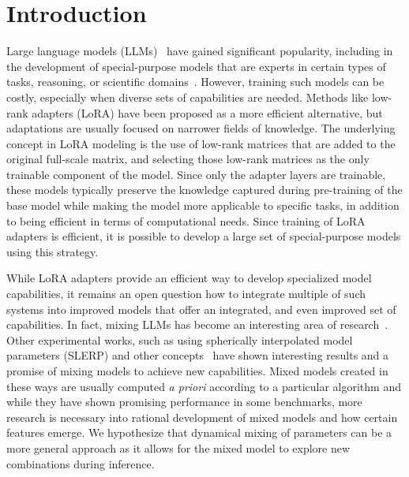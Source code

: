 \documentclass{article}
\begin{document}
\section{Introduction}
Large language models (LLMs)~\cite{Vaswani2017AttentionNeedc,Touvron2023LlamaModels,OpenAI2023GPT-4Report,Chowdhery2022PaLM:Pathways,Jiang2023Mistral7B,Gunasekar2023TextbooksNeed} have gained significant popularity, including in the development of special-purpose models that are experts in certain types of tasks, reasoning, or scientific domains~\cite{Bubeck2023SparksGPT-4,Buehler2023MechGPTModalities,Nejjar2023LLMsAnalysis,Buehler2023GenerativeDesign,Luu2023BioinspiredLLM:Materials,Luu2023GenerativeSolvents,Buehler2023MeLMProblemsb,Ge2023OpenAGI:Experts}.%
However, training such models can be costly, especially when diverse sets of capabilities are needed. Methods like low-rank adapters (LoRA)\cite{hu2021lora} have been proposed as a more efficient alternative, but adaptations are usually focused on narrower fields of knowledge.  The underlying concept in LoRA modeling is the use of low-rank matrices that are added to the original full-scale matrix, and selecting those low-rank matrices as the only trainable component of the model. Since only the adapter layers are trainable, these models typically preserve the knowledge captured during pre-training of the base model while making the model more applicable to specific tasks, in addition to being efficient in terms of computational needs. Since training of LoRA adapters is efficient, it is possible to develop a large set of special-purpose models using this strategy.

While LoRA adapters provide an efficient way to develop specialized model capabilities, it remains an open question how to integrate multiple of such systems into improved models that offer an integrated, and even improved set of capabilities. In fact, mixing LLMs has become an interesting area of research~\cite{Kim2023SOLARUp-Scaling}. Other experimental works, such as using spherically interpolated model parameters (SLERP) and other concepts~\cite{Arcee-ai/mergekit:Models.} have shown interesting results and a promise of mixing models to achieve new capabilities. Mixed models created in these ways are usually computed {\it a priori} according to a particular algorithm and while they have shown promising performance in some benchmarks, more research is necessary into rational development of mixed models and how certain features emerge. 
%
We hypothesize that dynamical mixing of parameters can be a more general approach as it allows for the mixed model to explore new combinations during inference.
\end{document}
